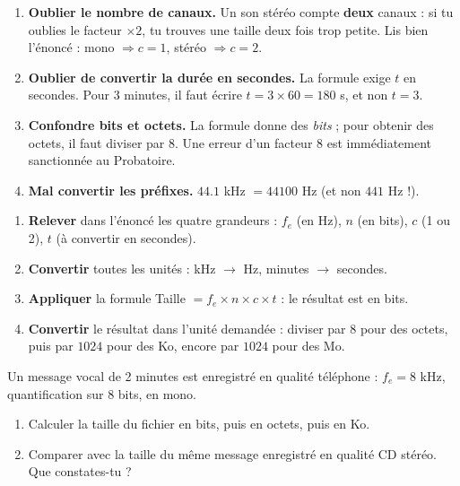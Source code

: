\documentclass[11pt]{article}
\begin{document}
\begin{attention}
\begin{enumerate}
\item \textbf{Oublier le nombre de canaux.} Un son stéréo compte \textbf{deux} canaux : si tu oublies le facteur $\times 2$, tu trouves une taille deux fois trop petite. Lis bien l'énoncé : mono $\Rightarrow c = 1$, stéréo $\Rightarrow c = 2$.
\item \textbf{Oublier de convertir la durée en secondes.} La formule exige $t$ en secondes. Pour 3 minutes, il faut écrire $t = 3 \times 60 = 180$ s, et non $t = 3$.
\item \textbf{Confondre bits et octets.} La formule donne des \emph{bits} ; pour obtenir des octets, il faut diviser par 8. Une erreur d'un facteur 8 est immédiatement sanctionnée au Probatoire.
\item \textbf{Mal convertir les préfixes.} $\num{44,1}$ kHz $= \num{44100}$ Hz (et non $441$ Hz !).
\end{enumerate}
\end{attention}

\begin{methode}
\begin{enumerate}
\item \textbf{Relever} dans l'énoncé les quatre grandeurs : $f_e$ (en Hz), $n$ (en bits), $c$ (1 ou 2), $t$ (à convertir en secondes).
\item \textbf{Convertir} toutes les unités : kHz $\rightarrow$ Hz, minutes $\rightarrow$ secondes.
\item \textbf{Appliquer} la formule Taille $= f_e \times n \times c \times t$ : le résultat est en bits.
\item \textbf{Convertir} le résultat dans l'unité demandée : diviser par 8 pour des octets, puis par $\num{1024}$ pour des Ko, encore par $\num{1024}$ pour des Mo.
\end{enumerate}
\end{methode}

\begin{exercice}
Un message vocal de 2 minutes est enregistré en qualité téléphone : $f_e = 8$ kHz, quantification sur 8 bits, en mono.
\begin{enumerate}
\item Calculer la taille du fichier en bits, puis en octets, puis en Ko.
\item Comparer avec la taille du même message enregistré en qualité CD stéréo. Que constates-tu ?
\end{enumerate}
\end{exercice}
\end{document}
